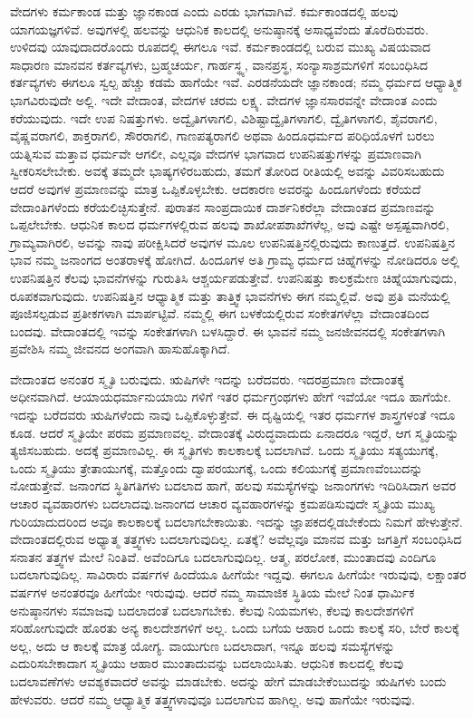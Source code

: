 ವೇದಗಳು ಕರ್ಮಕಾಂಡ ಮತ್ತು ಜ್ಞಾನಕಾಂಡ ಎಂದು ಎರಡು ಭಾಗವಾಗಿವೆ. ಕರ್ಮಕಾಂಡದಲ್ಲಿ ಹಲವು ಯಾಗಯಜ್ಞಗಳಿವೆ. ಅವುಗಳಲ್ಲಿ ಹಲವನ್ನು ಆಧುನಿಕ ಕಾಲದಲ್ಲಿ ಅನುಷ್ಠಾನಕ್ಕೆ ಅಸಾಧ್ಯವೆಂದು ತೊರೆದಿರುವರು. ಉಳಿದವು ಯಾವುದಾದರೊಂದು ರೂಪದಲ್ಲಿ ಈಗಲೂ ಇವೆ. ಕರ್ಮಕಾಂಡದಲ್ಲಿ ಬರುವ ಮುಖ್ಯ ವಿಷಯವಾದ ಸಾಧಾರಣ ಮಾನವನ ಕರ್ತವ್ಯಗಳು, ಬ್ರಹ್ಮಚರ್ಯ, ಗಾರ್ಹಸ್ಥ್ಯ, ವಾನಪ್ರಸ್ಥ, ಸಂನ್ಯಾಸಾಶ್ರಮಗಳಿಗೆ ಸಂಬಂಧಿಸಿದ ಕರ್ತವ್ಯಗಳು ಈಗಲೂ ಸ್ವಲ್ಪ ಹೆಚ್ಚು ಕಡಮೆ ಹಾಗೆಯೇ ಇವೆ. ಎರಡನೆಯದೇ ಜ್ಞಾನಕಾಂಡ; ನಮ್ಮ ಧರ್ಮದ ಆಧ್ಯಾತ್ಮಿಕ ಭಾಗವಿರುವುದೇ ಅಲ್ಲಿ. ಇದೇ ವೇದಾಂತ, ವೇದಗಳ ಚರಮ ಲಕ್ಷ್ಯ. ವೇದಗಳ ಜ್ಞಾನಸಾರವನ್ನೇ ವೇದಾಂತ ಎಂದು ಕರೆಯುವುದು. ಇದೇ ಉಪ ನಿಷತ್ತುಗಳು. ಅದ್ವೈತಿಗಳಾಗಲಿ, ವಿಶಿಷ್ಟಾದ್ವೈತಿಗಳಾಗಲಿ, ದ್ವೈತಿಗಳಾಗಲಿ, ಶೈವರಾಗಲಿ, ವೈಷ್ಣವರಾಗಲಿ, ಶಾಕ್ತರಾಗಲಿ, ಸೌರರಾಗಲಿ, ಗಾಣಪತ್ಯರಾಗಲಿ ಅಥವಾ ಹಿಂದೂಧರ್ಮದ ಪರಿಧಿಯೊಳಗೆ ಬರಲು ಯತ್ನಿಸುವ ಮತ್ತಾವ ಧರ್ಮವೇ ಆಗಲೀ, ಎಲ್ಲವೂ ವೇದಗಳ ಭಾಗವಾದ ಉಪನಿಷತ್ತುಗಳನ್ನು ಪ್ರಮಾಣವಾಗಿ ಸ್ವೀಕರಿಸಲೇಬೇಕು. ಅವಕ್ಕೆ ತಮ್ಮದೇ ಭಾಷ್ಯಗಳಿರಬಹುದು, ತಮಗೆ ತೋರಿದ ರೀತಿಯಲ್ಲಿ ಅವನ್ನು ವಿವರಿಸಬಹುದು ಆದರೆ ಅವುಗಳ ಪ್ರಮಾಣವನ್ನು ಮಾತ್ರ ಒಪ್ಪಿಕೊಳ್ಳಬೇಕು. ಆದಕಾರಣ ಅವರನ್ನು ಹಿಂದೂಗಳೆಂದು ಕರೆಯದೆ ವೇದಾಂತಿಗಳೆಂದು ಕರೆಯಲಿಚ್ಛಿಸುತ್ತೇನೆ. ಪುರಾತನ ಸಾಂಪ್ರದಾಯಿಕ ದಾರ್ಶನಿಕರೆಲ್ಲಾ ವೇದಾಂತದ ಪ್ರಮಾಣವನ್ನು ಒಪ್ಪಲೇಬೇಕು. ಆಧುನಿಕ ಕಾಲದ ಧರ್ಮಗಳಲ್ಲಿರುವ ಹಲವು ಶಾಖೋಪಶಾಖೆಗಳೆಲ್ಲ, ಅವು ಎಷ್ಟೇ ಅಸ್ಪಷ್ಟವಾಗಿರಲಿ, ಗ್ರಾಮ್ಯವಾಗಿರಲಿ, ಅವನ್ನು ನಾವು ಪರೀಕ್ಷಿಸಿದರೆ ಅವುಗಳ ಮೂಲ ಉಪನಿಷತ್ತಿನಲ್ಲಿರುವುದು ಕಾಣುತ್ತದೆ. ಉಪನಿಷತ್ತಿನ ಭಾವ ನಮ್ಮ ಜನಾಂಗದ ಅಂತರಾಳಕ್ಕೆ ಹೋಗಿದೆ. ಹಿಂದೂಗಳ ಅತಿ ಗ್ರಾಮ್ಯ ಧರ್ಮದ ಚಿಹ್ನೆಗಳನ್ನು ನೋಡಿದರೂ ಅಲ್ಲಿ ಉಪನಿಷತ್ತಿನ ಕೆಲವು ಭಾವನೆಗಳನ್ನು ಗುರುತಿಸಿ ಆಶ್ಚರ್ಯಪಡುತ್ತೇವೆ. ಉಪನಿಷತ್ತು ಕಾಲಕ್ರಮೇಣ ಚಿಹ್ನೆಯಾಗುವುದು, ರೂಪಕವಾಗುವುದು. ಉಪನಿಷತ್ತಿನ ಆಧ್ಯಾತ್ಮಿಕ ಮತ್ತು ತಾತ್ತ್ವಿಕ ಭಾವನೆಗಳು ಈಗ ನಮ್ಮಲ್ಲಿವೆ. ಅವು ಪ್ರತಿ ಮನೆಯಲ್ಲಿ ಪೂಜಿಸಲ್ಪಡುವ ಪ್ರತೀಕಗಳಾಗಿ ಮಾರ್ಪಟ್ಟಿವೆ. ನಮ್ಮಲ್ಲಿ ಈಗ ಬಳಕೆಯಲ್ಲಿರುವ ಸಂಕೇತಗಳೆಲ್ಲಾ ವೇದಾಂತದಿಂದ ಬಂದವು. ವೇದಾಂತದಲ್ಲಿ ಇವನ್ನು ಸಂಕೇತಗಳಾಗಿ ಬಳಸಿದ್ದಾರೆ. ಈ ಭಾವನೆ ನಮ್ಮ ಜನಜೀವನದಲ್ಲಿ ಸಂಕೇತಗಳಾಗಿ ಪ್ರವೇಶಿಸಿ ನಮ್ಮ ಜೀವನದ ಅಂಗವಾಗಿ ಹಾಸುಹೊಕ್ಕಾಗಿದೆ. 

ವೇದಾಂತದ ಅನಂತರ ಸ್ಮೃತಿ ಬರುವುದು. ಋಷಿಗಳೇ ಇದನ್ನು ಬರೆದವರು. ಇದರಪ್ರಮಾಣ ವೇದಾಂತಕ್ಕೆ ಅಧೀನವಾಗಿದೆ. ಆಯಾಯಧರ್ಮಾನುಯಾಯಿ ಗಳಿಗೆ ಇತರ ಧರ್ಮಗ್ರಂಥಗಳು ಹೇಗೆ ಇವೆಯೋ ಇದೂ ಹಾಗೆಯೇ. ಇದನ್ನು ಬರೆದವರು ಋಷಿಗಳೆಂದು ನಾವು ಒಪ್ಪಿಕೊಳ್ಳುತ್ತೇವೆ. ಈ ದೃಷ್ಟಿಯಲ್ಲಿ ಇತರ ಧರ್ಮಗಳ ಶಾಸ್ತ್ರಗಳಂತೆ ಇದೂ ಕೂಡ. ಆದರೆ ಸ್ಮೃತಿಯೇ ಪರಮ ಪ್ರಮಾಣ\-ವಲ್ಲ. ವೇದಾಂತಕ್ಕೆ ವಿರುದ್ಧವಾದುದು ಏನಾದರೂ ಇದ್ದರೆ, ಆಗ ಸ್ಮೃತಿಯನ್ನು ತ್ಯಜಿಸಬಹುದು. ಅದಕ್ಕೆ ಪ್ರಮಾಣವಿಲ್ಲ. ಈ ಸ್ಮೃತಿಗಳು ಕಾಲಕಾಲಕ್ಕೆ ಬದಲಾಗಿವೆ. ಒಂದು ಸ್ಮೃತಿಯು ಸತ್ಯಯುಗಕ್ಕೆ, ಒಂದು ಸ್ಮೃತಿಯು ತ್ರೇತಾಯುಗಕ್ಕೆ, ಮತ್ತೊಂದು ದ್ವಾಪರಯುಗಕ್ಕೆ, ಒಂದು ಕಲಿಯುಗಕ್ಕೆ ಪ್ರಮಾಣವೆಂಬುದನ್ನು ನೋಡುತ್ತೇವೆ. ಜನಾಂಗದ ಸ್ಥಿತಿಗತಿಗಳು ಬದಲಾದ ಹಾಗೆ, ಹಲವು ಸಮಸ್ಯೆಗಳನ್ನು ಜನಾಂಗಗಳು ಇದಿರಿಸಿದಾಗ ಅವರ ಆಚಾರ ವ್ಯವಹಾರಗಳು ಬದಲಾದವು.\break ಜನಾಂಗದ ಆಚಾರ ವ್ಯವಹಾರಗಳನ್ನು ಕ್ರಮಪಡಿಸುವುದೇ ಸ್ಮೃತಿಯ ಮುಖ್ಯ ಗುರಿಯಾದುದರಿಂದ ಅವೂ ಕಾಲಕಾಲಕ್ಕೆ ಬದಲಾಗಬೇಕಾಯಿತು. ಇದನ್ನು ಜ್ಞಾಪಕದಲ್ಲಿಡಬೇಕೆಂದು ನಿಮಗೆ ಹೇಳುತ್ತೇನೆ. ವೇದಾಂತದಲ್ಲಿರುವ ಅಧ್ಯಾತ್ಮ ತತ್ತ್ವಗಳು ಬದಲಾಗುವುದಿಲ್ಲ. ಏತಕ್ಕೆ? ಅವೆಲ್ಲವೂ ಮಾನವ ಮತ್ತು ಜಗತ್ತಿಗೆ ಸಂಬಂಧಿಸಿದ ಸನಾತನ ತತ್ತ್ವಗಳ ಮೇಲೆ ನಿಂತಿವೆ. ಅವೆಂದಿಗೂ ಬದಲಾಗುವುದಿಲ್ಲ. ಆತ್ಮ, ಪರಲೋಕ, ಮುಂತಾದವು ಎಂದಿಗೂ ಬದಲಾಗುವುದಿಲ್ಲ. ಸಾವಿರಾರು ವರ್ಷಗಳ ಹಿಂದೆಯೂ ಹೀಗೆಯೇ ಇದ್ದವು. ಈಗಲೂ ಹೀಗೆಯೇ ಇರುವುವು, ಲಕ್ಷಾಂತರ ವರ್ಷಗಳ ಅನಂತರವೂ ಹೀಗೆಯೇ ಇರುವುವು. ಆದರೆ ನಮ್ಮ ಸಾಮಾಜಿಕ ಸ್ಥಿತಿಯ ಮೇಲೆ ನಿಂತ ಧಾರ್ಮಿಕ ಅನುಷ್ಠಾನಗಳು ಸಮಾಜವು ಬದಲಾದಂತೆ ಬದಲಾಗಬೇಕು. ಕೆಲವು ನಿಯಮಗಳು, ಕೆಲವು ಕಾಲದೇಶಗಳಿಗೆ ಸರಿಹೋಗುವುದೇ ಹೊರತು ಅನ್ಯ ಕಾಲದೇಶಗಳಿಗೆ ಅಲ್ಲ. ಒಂದು ಬಗೆಯ ಆಹಾರ ಒಂದು ಕಾಲಕ್ಕೆ ಸರಿ, ಬೇರೆ ಕಾಲಕ್ಕೆ ಅಲ್ಲ, ಅದು ಆ ಕಾಲಕ್ಕೆ ಮಾತ್ರ ಯೋಗ್ಯ. ವಾಯುಗುಣ ಬದಲಾದಾಗ, ಇನ್ನೂ ಹಲವು ಸಮಸ್ಯೆಗಳನ್ನು ಎದುರಿಸಬೇಕಾದಾಗ ಸ್ಮೃತಿಯು ಆಹಾರ ಮುಂತಾದುವನ್ನು ಬದಲಾಯಿಸಿತು. ಆಧುನಿಕ ಕಾಲದಲ್ಲಿ ಕೆಲವು ಬದಲಾವಣೆಗಳು ಆವಶ್ಯಕವಾದರೆ ಅವನ್ನು ಮಾಡಬೇಕು. ಅದನ್ನು ಹೇಗೆ ಮಾಡಬೇಕೆಂಬುದನ್ನು ಋಷಿಗಳು ಬಂದು ಹೇಳುವರು. ಆದರೆ ನಮ್ಮ ಆಧ್ಯಾತ್ಮಿಕ ತತ್ತ್ವಗಳಾವುವೂ ಬದಲಾಗುವ ಹಾಗಿಲ್ಲ. ಅವು ಹಾಗೆಯೇ ಇರುವುವು. 

